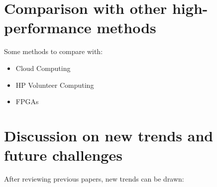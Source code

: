 \documentclass{article}
\begin{document}
\section{Comparison with other high-performance methods}
\label{sec:comparison-hpc}

Some methods to compare with:

\begin{itemize}
\item Cloud Computing
\item HP Volunteer Computing    %
\item FPGAs
\end{itemize}



\section{Discussion on new trends and future challenges}
\label{sec:discussion}

After reviewing previous papers, new trends can be drawn:
\end{document}
